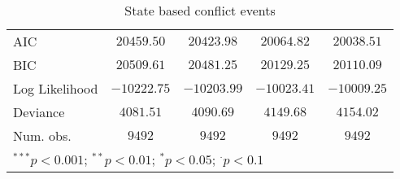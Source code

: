 \begin{sidewaystable}
\begin{center}
{\begin{tabular}{l c c c c}
\hline
AIC             & $20459.50$    & $20423.98$    & $20064.82$      & $20038.51$      \\
BIC             & $20509.61$    & $20481.25$    & $20129.25$      & $20110.09$      \\
Log Likelihood  & $-10222.75$   & $-10203.99$   & $-10023.41$     & $-10009.25$     \\
Deviance        & $4081.51$     & $4090.69$     & $4149.68$       & $4154.02$       \\
Num. obs.       & $9492$        & $9492$        & $9492$          & $9492$          \\
\hline
\multicolumn{5}{l}{\scriptsize{$^{***}p<0.001$; $^{**}p<0.01$; $^{*}p<0.05$; $^{\cdot}p<0.1$}}
\end{tabular}
}
\caption{State based conflict events}
\label{state_based}
\end{center}
\end{sidewaystable}
